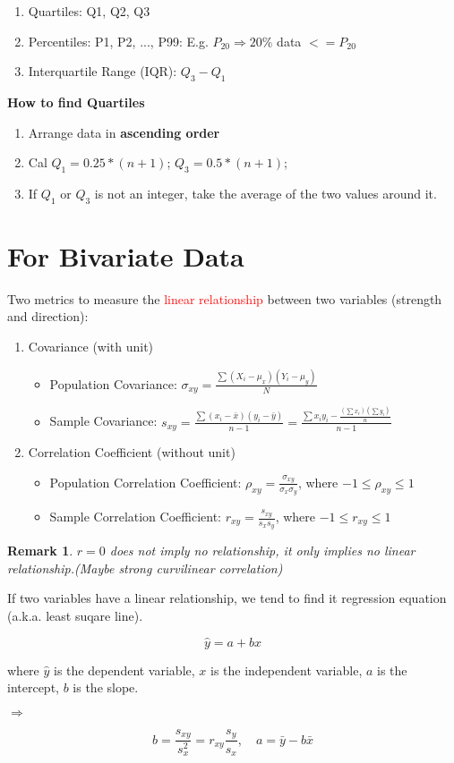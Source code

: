 \documentclass[12pt,a4paper]{article}
\newtheorem*{rem}{Remark}
\newcommand{\Remark}[1]{
  \begin{rem}
    \color{cyan}
    #1
  \end{rem}
}
\begin{document}
\begin{enumerate}
    \item Quartiles: Q1, Q2, Q3
    \item Percentiles: P1, P2, ..., P99: E.g. $P_{20} \Rightarrow 20\%$ data $<= P_{20}$
    \item Interquartile Range (IQR): $Q_3 - Q_1$
\end{enumerate}

\textbf{How to find Quartiles}

\begin{enumerate}
    \item Arrange data in \textbf{ascending order}
    \item Cal $Q_1 = 0.25 * (n + 1)$; $Q_3 = 0.5 * (n + 1)$;
    \item If $Q_1$ or $Q_3$ is not an integer, take the average of the two values around it.
\end{enumerate}

\section*{For Bivariate Data}

Two metrics to measure the \textcolor{red}{linear relationship} between two variables (strength and direction):

\begin{enumerate}
    \item Covariance (with unit)
    \begin{itemize}
        \item Population Covariance: $\sigma_{xy} = \frac{\sum (X_i - \mu_x)(Y_i - \mu_y)}{N}$
        \item Sample Covariance: $s_{xy} = \frac{\sum (x_i - \bar{x})(y_i - \bar{y})}{n-1} = \frac{\sum x_i y_i - \frac{(\sum x_i)(\sum y_i)}{n}}{n-1}$
    \end{itemize}
    \item Correlation Coefficient (without unit)
    \begin{itemize}
        \item Population Correlation Coefficient: $\rho_{xy} = \frac{\sigma_{xy}}{\sigma_x \sigma_y}$, where $-1 \leq \rho_{xy} \leq 1$
        \item Sample Correlation Coefficient: $r_{xy} = \frac{s_{xy}}{s_x s_y}$, where $-1 \leq r_{xy} \leq 1$
    \end{itemize}
\end{enumerate}

\Remark{$r = 0$ does not imply no relationship, it only implies no linear relationship.(Maybe strong curvilinear correlation)}

If two variables have a linear relationship, we tend to find it regression equation (a.k.a. least suqare line).

\[\hat{y} = a + bx\]

where $\hat{y}$ is the dependent variable, $x$ is the independent variable, $a$ is the intercept, $b$ is the slope.

$\Rightarrow$

\[b = \frac{s_{xy}}{s_x^2} = r_{xy} \frac{s_y}{s_x},\quad a = \bar{y} - b\bar{x}\]
\end{document}
